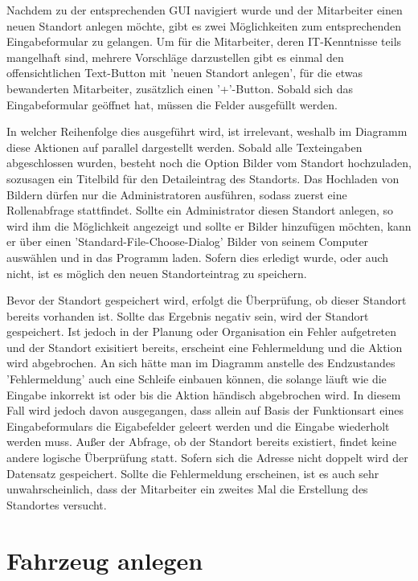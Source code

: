 Nachdem zu der entsprechenden GUI navigiert wurde und der Mitarbeiter einen neuen Standort anlegen möchte, gibt es zwei Möglichkeiten zum entsprechenden Eingabeformular zu gelangen. Um für die Mitarbeiter, deren IT-Kenntnisse teils mangelhaft sind, mehrere Vorschläge darzustellen gibt es einmal den offensichtlichen Text-Button mit 'neuen Standort anlegen', für die etwas bewanderten Mitarbeiter, zusätzlich einen '+'-Button. Sobald sich das Eingabeformular geöffnet hat, müssen die Felder ausgefüllt werden. 


In welcher Reihenfolge dies ausgeführt wird, ist irrelevant, weshalb im Diagramm diese Aktionen auf parallel dargestellt werden. Sobald alle Texteingaben abgeschlossen wurden, besteht noch die Option Bilder vom Standort hochzuladen, sozusagen ein Titelbild für den Detaileintrag des Standorts. Das Hochladen von Bildern dürfen nur die Administratoren ausführen, sodass zuerst eine Rollenabfrage stattfindet. Sollte ein Administrator diesen Standort anlegen, so wird ihm die Möglichkeit angezeigt und sollte er Bilder hinzufügen möchten, kann er über einen 'Standard-File-Choose-Dialog' Bilder von seinem Computer auswählen und in das Programm laden. Sofern dies erledigt wurde, oder auch nicht, ist es möglich den neuen Standorteintrag zu speichern. 


Bevor der Standort gespeichert wird, erfolgt die Überprüfung, ob dieser Standort bereits vorhanden ist. Sollte das Ergebnis negativ sein, wird der Standort gespeichert. Ist jedoch in der Planung oder Organisation ein Fehler aufgetreten und der Standort exisitiert bereits, erscheint eine Fehlermeldung und die Aktion wird abgebrochen. An sich hätte man im Diagramm anstelle des Endzustandes 'Fehlermeldung' auch eine Schleife einbauen können, die solange läuft wie die Eingabe inkorrekt ist oder bis die Aktion händisch abgebrochen wird. In diesem Fall wird jedoch davon ausgegangen, dass allein auf Basis der Funktionsart eines Eingabeformulars die Eigabefelder geleert werden und die Eingabe wiederholt werden muss. Außer der Abfrage, ob der Standort bereits existiert, findet keine andere logische Überprüfung statt. Sofern sich die Adresse nicht doppelt wird der Datensatz gespeichert. Sollte die Fehlermeldung erscheinen, ist es auch sehr unwahrscheinlich, dass der Mitarbeiter ein zweites Mal die Erstellung des Standortes versucht. 
\newpage

\section{Fahrzeug anlegen}

